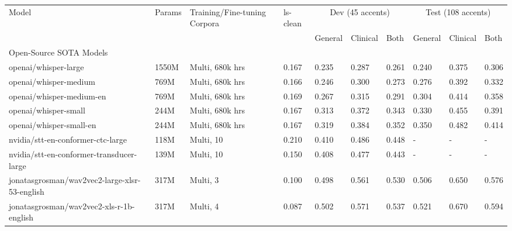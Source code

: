 \documentclass[11pt,a4paper]{article}
\begin{document}
%

\begin{table*}
\tiny
\centering
\begin{tabular}{l|l|p{1.8cm}|p{0.7cm}|l|l|l|l|l|l}
\toprule 
Model & Params & Training/Fine-tuning Corpora & ls-clean & \multicolumn{3}{c|}{Dev (45 accents)} & \multicolumn{3}{c}{Test (108 accents)}\\
  & & &  & General & Clinical & Both & General & Clinical & Both \\
\midrule
\multicolumn{10}{l}{Open-Source SOTA Models}\\
\hline
openai/whisper-large     & 1550M & Multi, 680k hrs  &    0.167          &   0.235 &    0.287 &  0.261 &   0.240 &    0.375 &  0.306 \\
openai/whisper-medium     & 769M & Multi, 680k hrs &       0.166       &   0.246 &    0.300 &  0.273 &   0.276 &    0.392 &  0.332 \\
openai/whisper-medium-en   & 769M& Multi, 680k hrs   &     0.169          &   0.267 &    0.315 &  0.291 &   0.304 &    0.414 &  0.358 \\
openai/whisper-small    & 244M & Multi, 680k hrs  &          0.167           &   0.313 &    0.372 &  0.343 &   0.330 &    0.455 &  0.391 \\
openai/whisper-small-en  & 244M & Multi, 680k hrs   &      0.167  &   0.319 &    0.384 &  0.352 &   0.350 &   0.482 &  0.414 \\
nvidia/stt-en-conformer-ctc-large     & 118M & Multi, 10 &   0.210      &   0.410 &    0.486 &  0.448 &     - &      - &    - \\
nvidia/stt-en-conformer-transducer-large  & 139M & Multi, 10  &  0.150   &   0.408 &    0.477 &  0.443 &     - &      - &    - \\
jonatasgrosman/wav2vec2-large-xlsr-53-english  & 317M & Multi, 3  &  0.100  &   0.498 &    0.561 &  0.530 &   0.506 &    0.650 &  0.576 \\
jonatasgrosman/wav2vec2-xls-r-1b-english      & 317M & Multi, 4  &  0.087   &   0.502 &    0.571 &  0.537 &   0.521 &    0.670 &  0.594 \\


\end{tabular}
\end{table*}
\end{document}
